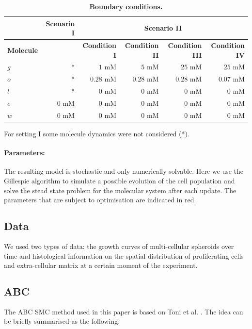 \documentclass[10pt,letterpaper]{article}
\begin{document}
\begin{table}[!ht]
\begin{adjustwidth}{-0.5in}{0in} %
\caption{
{\bf Boundary conditions.}}
\begin{tabular}{|l |r |r|r|r|r|}
\hline
 			& {\bf Scenario I} & \multicolumn{4}{|c|}{\bf Scenario II}\\ \hline
{\bf Molecule} 	&				&{\bf Condition I} 	&{\bf Condition II} 	&{\bf Condition III} 	&{\bf Condition IV}\\ \hline
$g$			& * 				& $1$ mM			& $5$ mM			& $25$ mM			&$25$ mM\\ \hline
$o$			& *				& $0.28$ mM		& $0.28$ mM		& $0.28$ mM			&$0.07$ mM\\ \hline
$l$				& *				& $0$ mM			& $0$ mM			& $0$ mM				& $0$ mM\\ \hline
$e$			& $0$ mM		& $0$ mM			& $0$ mM			& $0$ mM				& $0$ mM\\ \hline
$w$			& $0$ mM		& $0$ mM			& $0$ mM			& $0$ mM				& $0$ mM\\ \hline
\end{tabular}
For setting I some molecule dynamics were not considered (*).
\label{tab:boundary conditions}
\end{adjustwidth}
\end{table}


\paragraph{Parameters:} 

The resulting model is stochastic and only numerically solvable. Here we use the Gillespie algorithm to simulate a possible evolution of the cell population and solve the stead state problem for the molecular system after each update. The parameters that are subject to optimisation are indicated in red.

\subsection*{Data} 
We used two types of data: the growth curves of multi-cellular spheroids over time and histological information on the spatial distribution of proliferating cells and extra-cellular matrix at a certain moment of the experiment.

\subsection*{ABC}
The ABC SMC method used in this paper is based on Toni et al. \cite{ToniWel2009}. The idea can be briefly summarised as the following: 
\end{document}
